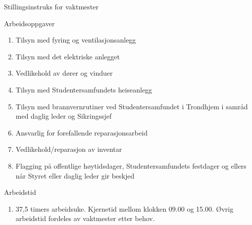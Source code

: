 \documentclass[fsbok.tex]{subfiles}
\begin{document}
\begin{instruks*}{Stillingsinstruks for vaktmester}
    \begin{instruksledd}{Arbeidsoppgaver}
        \begin{enumerate}
            \item Tilsyn med fyring og ventilasjonsanlegg
            \item Tilsyn med det elektriske anlegget
            \item Vedlikehold av dører og vinduer
            \item Tilsyn med Studentersamfundets heiseanlegg
            \item Tilsyn med brannvernrutiner ved Studentersamfundet i Trondhjem i samråd med daglig leder og Sikringssjef
            \item Ansvarlig for forefallende reparasjonsarbeid
            \item Vedlikehold/reparasjon av inventar
            \item Flagging på offentlige høytidsdager, Studentersamfundets festdager og ellers når Styret eller daglig leder gir
                beskjed   
        \end{enumerate}
    \end{instruksledd}

    \begin{instruksledd}{Arbeidstid}
        \begin{enumerate}
            \item 37,5 timers arbeidsuke. Kjernetid mellom klokken 09.00 og 15.00. Øvrig arbeidstid fordeles av vaktmester
                etter behov. 
        \end{enumerate}
    \end{instruksledd}

\end{instruks*}
\end{document}
